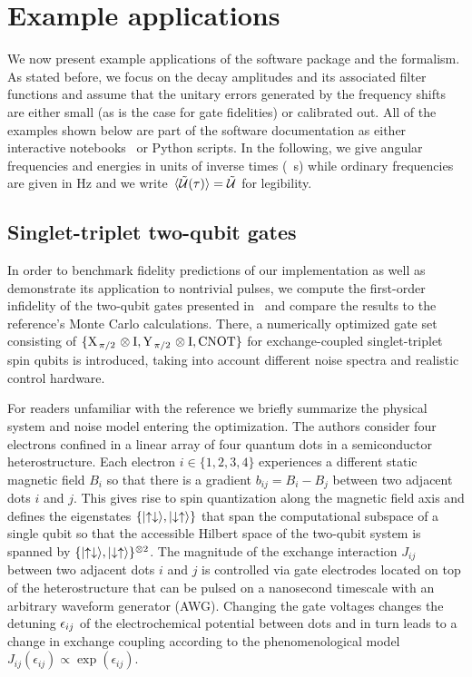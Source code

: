 \chapter{Example applications}\label{ch:ff:examples}
We now present example applications of the software package and the formalism.
As stated before, we focus on the decay amplitudes \decayamps and its associated filter functions and assume that the unitary errors generated by the frequency shifts \freqshifts are either small (as is the case for gate fidelities) or calibrated out.
All of the examples shown below are part of the software documentation as either interactive \jupyter notebooks~\cite{Kluyver2016} or Python scripts.
In the following, we give angular frequencies and energies in units of inverse times (\eg \si{\per\second}) while ordinary frequencies are given in \si{\hertz} and we write $\liouvUetavg = \liouvUe$ for legibility.

\section{Singlet-triplet two-qubit gates}\label{sec:ff:examples:optimized_gates}
In order to benchmark fidelity predictions of our implementation as well as demonstrate its application to nontrivial pulses, we compute the first-order infidelity of the two-qubit gates presented in~ and compare the results to the reference's Monte Carlo calculations.
There, a numerically optimized gate set consisting of $\lbrace\XID2,\YID2,\CNOT\rbrace$ for exchange-coupled singlet-triplet spin qubits is introduced, taking into account different noise spectra and realistic control hardware.

For readers unfamiliar with the reference we briefly summarize the physical system and noise model entering the optimization.
The authors consider four electrons confined in a linear array of four quantum dots in a semiconductor heterostructure.
Each electron $i\in\lbrace 1,2,3,4\rbrace$ experiences a different static magnetic field $B_i$ so that there is a gradient $b_{ij} = B_i - B_j$ between two adjacent dots $i$ and $j$.
This gives rise to spin quantization along the magnetic field axis and defines the eigenstates $\lbrace\mbox{\ensuremath{\ket{\uparrow\downarrow}}},\mbox{\ensuremath{\ket{\downarrow\uparrow}}}\rbrace$ that span the computational subspace of a single qubit so that the accessible Hilbert space of the two-qubit system is spanned by $\lbrace\mbox{\ensuremath{\ket{\uparrow\downarrow}}},\mbox{\ensuremath{\ket{\downarrow\uparrow}}}\rbrace^{\otimes 2}$.
The magnitude of the exchange interaction $J_{ij}$ between two adjacent dots $i$ and $j$ is controlled via gate electrodes located on top of the heterostructure that can be pulsed on a nanosecond timescale with an arbitrary waveform generator (AWG).
Changing the gate voltages changes the detuning $\epsilon_{ij}$ of the electrochemical potential between dots and in turn leads to a change in exchange coupling according to the phenomenological model $J_{ij}(\epsilon_{ij})\propto\exp(\epsilon_{ij})$.

